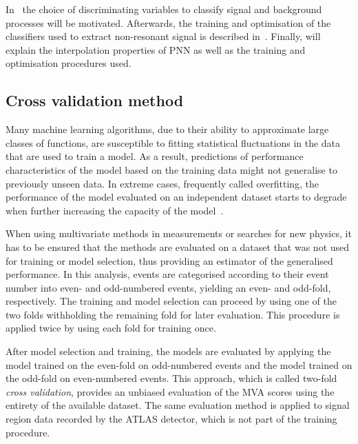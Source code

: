 In~ the choice of
discriminating variables to classify signal and background processes
will be motivated. Afterwards, the training and optimisation of the
classifiers used to extract non-resonant signal is described
in~. Finally,  will explain the
interpolation properties of PNN as well as the training and
optimisation procedures used. 


\subsection{Cross validation method}
\label{sec:mva_crossvalidation}

Many machine learning algorithms, due to their ability to approximate
large classes of functions, are susceptible to fitting statistical
fluctuations in the data that are used to train a model. As a result,
predictions of performance characteristics of the model based on the
training data might not generalise to previously unseen data. In
extreme cases, frequently called overfitting, the performance of the
model evaluated on an independent dataset starts to degrade when
further increasing the capacity of the model~\cite{hastie09}.

When using multivariate methods in measurements or searches for new
physics, it has to be ensured that the methods are evaluated on a
dataset that was not used for training or model selection, thus
providing an estimator of the generalised performance. In this
analysis, events are categorised according to their event number into
even- and odd-numbered events, yielding an even- and odd-fold,
respectively. The training and model selection can proceed by using
one of the two folds withholding the remaining fold for later
evaluation. This procedure is applied twice by using each fold for
training once.

After model selection and training, the models are evaluated by
applying the model trained on the even-fold on odd-numbered events and
the model trained on the odd-fold on even-numbered events. This
approach, which is called two-fold \emph{cross validation}, provides
an unbiased evaluation of the MVA scores using the entirety of the
available dataset. The same evaluation method is applied to signal
region data recorded by the ATLAS detector, which is not part of the
training procedure.



